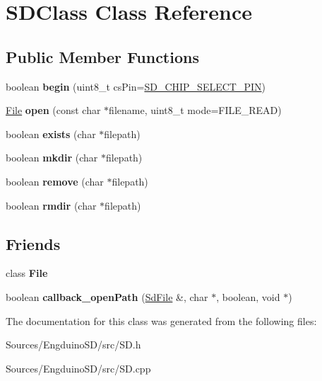 \hypertarget{class_s_d_class}{}\section{S\+D\+Class Class Reference}
\label{class_s_d_class}
\subsection*{Public Member Functions}
\begin{DoxyCompactItemize}
\item 
\hypertarget{class_s_d_class_aec226b7ad1f7db8b21b9d625cde89356}{}boolean {\bfseries begin} (uint8\+\_\+t cs\+Pin=\hyperlink{_sd2_card_8h_ae6b17538c14ba6c91ccb513db2c4c29c}{S\+D\+\_\+\+C\+H\+I\+P\+\_\+\+S\+E\+L\+E\+C\+T\+\_\+\+P\+I\+N})\label{class_s_d_class_aec226b7ad1f7db8b21b9d625cde89356}

\item 
\hypertarget{class_s_d_class_a02207388d102649d4a17901183c13f18}{}\hyperlink{class_file}{File} {\bfseries open} (const char $\ast$filename, uint8\+\_\+t mode=F\+I\+L\+E\+\_\+\+R\+E\+A\+D)\label{class_s_d_class_a02207388d102649d4a17901183c13f18}

\item 
\hypertarget{class_s_d_class_a0d9347b5446756f7f4dee9dd0c93fe5d}{}boolean {\bfseries exists} (char $\ast$filepath)\label{class_s_d_class_a0d9347b5446756f7f4dee9dd0c93fe5d}

\item 
\hypertarget{class_s_d_class_adb5edef260fcd12f2cc1e516d4d3b4a6}{}boolean {\bfseries mkdir} (char $\ast$filepath)\label{class_s_d_class_adb5edef260fcd12f2cc1e516d4d3b4a6}

\item 
\hypertarget{class_s_d_class_a0286f8bb49b66dfc1f7b176af9e6694b}{}boolean {\bfseries remove} (char $\ast$filepath)\label{class_s_d_class_a0286f8bb49b66dfc1f7b176af9e6694b}

\item 
\hypertarget{class_s_d_class_a484b22ac8e9506474a4fc738e6f3d71e}{}boolean {\bfseries rmdir} (char $\ast$filepath)\label{class_s_d_class_a484b22ac8e9506474a4fc738e6f3d71e}

\end{DoxyCompactItemize}
\subsection*{Friends}
\begin{DoxyCompactItemize}
\item 
\hypertarget{class_s_d_class_a68d15876ad188b7628261b12d0eac8aa}{}class {\bfseries File}\label{class_s_d_class_a68d15876ad188b7628261b12d0eac8aa}

\item 
\hypertarget{class_s_d_class_a8446a505a6d0edaccab9e8ff4002eae4}{}boolean {\bfseries callback\+\_\+open\+Path} (\hyperlink{class_sd_file}{Sd\+File} \&, char $\ast$, boolean, void $\ast$)\label{class_s_d_class_a8446a505a6d0edaccab9e8ff4002eae4}

\end{DoxyCompactItemize}


The documentation for this class was generated from the following files\+:\begin{DoxyCompactItemize}
\item 
Sources/\+Engduino\+S\+D/src/S\+D.\+h\item 
Sources/\+Engduino\+S\+D/src/S\+D.\+cpp\end{DoxyCompactItemize}
